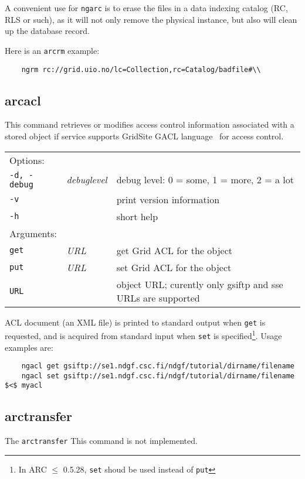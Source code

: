\begin{framed}
   A convenient use for \texttt{ngarc} is to erase the files in a data
   indexing catalog (RC, RLS or such), as it will not only remove the
   physical instance, but also will clean up the database record.
\end{framed}

Here is an \texttt{arcrm} example:

\begin{verbatim}
    ngrm rc://grid.uio.no/lc=Collection,rc=Catalog/badfile#\\
\end{verbatim}

\subsection{arcacl}\label{sec:arcacl}

This command retrieves or modifies
access control information associated with a stored object if service
supports GridSite GACL language~\cite{gacl} for access control.
\hspace*{0.5cm}
\begin{shaded}
\end{shaded}
\begin{longtable}{llp{8cm}}
   Options:&&\\
    \texttt{-d, -debug} & \textit{debuglevel} &debug level: 0 = some, 1 = more, 2 = a lot \\
    \texttt{-v} && print version information\\
    \texttt{-h} && short help\\
   Arguments:&&\\
    \texttt{get} &\textit{URL}& get Grid ACL for the object\\
    \texttt{put} &\textit{URL}& set Grid ACL for the object\\
    \texttt{URL} && object URL; curently only gsiftp and sse URLs are supported\\
\end{longtable}

ACL document (an XML file) is printed to standard output when
\texttt{get} is requested, and is acquired from standard input when
\texttt{set} is specified\footnote{In ARC $\leq$ 0.5.28, \texttt{set}
  shoud be used instead of \texttt{put}}. Usage examples are:
\begin{verbatim}
    ngacl get gsiftp://se1.ndgf.csc.fi/ndgf/tutorial/dirname/filename
    ngacl set gsiftp://se1.ndgf.csc.fi/ndgf/tutorial/dirname/filename $<$ myacl
\end{verbatim}

\subsection{arctransfer}\label{sec:arctransfer}
The \texttt{arctransfer}
This command is not implemented.